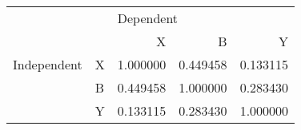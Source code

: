 \begin{tabular}{llrrr}
\toprule
            &   & \multicolumn{3}{l}{Dependent} \\
            &   &         X &         B &         Y \\
\midrule
Independent & X &  1.000000 &  0.449458 &  0.133115 \\
            & B &  0.449458 &  1.000000 &  0.283430 \\
            & Y &  0.133115 &  0.283430 &  1.000000 \\
\bottomrule
\end{tabular}
